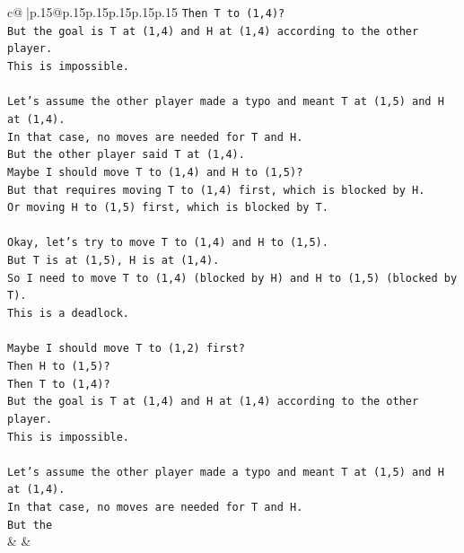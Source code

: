 \documentclass{article}
\begin{document}
{\begin{supertabular}{c@{$\;$}|p{.15\linewidth}@{}p{.15\linewidth}p{.15\linewidth}p{.15\linewidth}p{.15\linewidth}p{.15\linewidth}}
{{{\texttt{Then T to (1,4)?} \\
\texttt{But the goal is T at (1,4) and H at (1,4) according to the other player.} \\
\texttt{This is impossible.} \\
\\ 
\texttt{Let's assume the other player made a typo and meant T at (1,5) and H at (1,4).} \\
\texttt{In that case, no moves are needed for T and H.} \\
\texttt{But the other player said T at (1,4).} \\
\texttt{Maybe I should move T to (1,4) and H to (1,5)?} \\
\texttt{But that requires moving T to (1,4) first, which is blocked by H.} \\
\texttt{Or moving H to (1,5) first, which is blocked by T.} \\
\\ 
\texttt{Okay, let's try to move T to (1,4) and H to (1,5).} \\
\texttt{But T is at (1,5), H is at (1,4).} \\
\texttt{So I need to move T to (1,4) (blocked by H) and H to (1,5) (blocked by T).} \\
\texttt{This is a deadlock.} \\
\\ 
\texttt{Maybe I should move T to (1,2) first?} \\
\texttt{Then H to (1,5)?} \\
\texttt{Then T to (1,4)?} \\
\texttt{But the goal is T at (1,4) and H at (1,4) according to the other player.} \\
\texttt{This is impossible.} \\
\\ 
\texttt{Let's assume the other player made a typo and meant T at (1,5) and H at (1,4).} \\
\texttt{In that case, no moves are needed for T and H.} \\
\texttt{But the} \\
            }
        }
    }
    & & \\ \\


\end{supertabular}}
\end{document}
